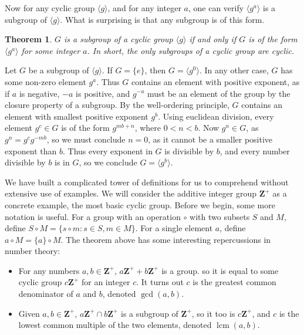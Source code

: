 \documentclass[12pt]{amsbook}
\makeatletter
\theoremstyle{plain}
\newtheorem{theorem}{Theorem}[chapter]
\theoremstyle{definition}
\renewenvironment{proof}[1][\proofname]{\par
  \pushQED{\qed}%
  \normalfont \topsep6\p@\@plus6\p@\relax
  \list{}{\leftmargin=0em
          \rightmargin=\leftmargin
          \settowidth{\itemindent}{\itshape#1}%
          \labelwidth=\itemindent}

  \item[\hskip\labelsep
        \itshape
    #1\@addpunct{.}]\ignorespaces
}{%
  \popQED\endlist\@endpefalse
}
\DeclareMathOperator{\lcm}{lcm}
\makeatother
\begin{document}
Now for any cyclic group $\langle g \rangle$, and for any integer $a$, one can verify $\langle g^a \rangle$ is a subgroup of $\langle g \rangle$. What is surprising is that any subgroup is of this form.

\begin{theorem}
    $G$ is a subgroup of a cyclic group $\langle g \rangle$ if and only if $G$ is of the form $\langle g^a \rangle$ for some integer $a$. In short, the only subgroups of a cyclic group are cyclic.
\end{theorem}
\begin{proof}
    Let $G$ be a subgroup of $\langle g \rangle$. If $G = \{ e \}$, then $G = \langle g^0 \rangle$. In any other case, $G$ has some non-zero element $g^a$. Thus $G$ contains an element with positive exponent, as if $a$ is negative, $-a$ is positive, and $g^{-a}$ must be an element of the group by the closure property of a subgroup. By the well-ordering principle, $G$ contains an element with smallest positive exponent $g^b$. Using euclidean division, every element $g^c \in G$ is of the form $g^{mb + n}$, where $0 < n < b$. Now $g^n \in G$, as $g^n = g^cg^{-mb}$, so we must conclude $n = 0$, as it cannot be a smaller positive exponent than $b$. Thus every exponent in $G$ is divisible by $b$, and every number divisible by $b$ is in $G$, so we conclude $G = \langle g^b \rangle$.
\end{proof}

We have built a complicated tower of definitions for us to comprehend without extensive use of examples. We will consider the additive integer group $\mathbf{Z}^+$ as a concrete example, the most basic cyclic group. Before we begin, some more notation is useful. For a group with an operation $\circ$ with two subsets $S$ and $M$, define $S \circ M = \{ s \circ m : s \in S, m \in M \}$. For a single element $a$, define $a \circ M = \{ a \} \circ M$. The theorem above has some interesting repercussions in number theory:
\begin{itemize}
    \item For any numbers $a, b \in \mathbf{Z}^+$, $a\mathbf{Z}^+ + b\mathbf{Z}^+$ is a group. so it is equal to some cyclic group $c\mathbf{Z}^+$ for an integer $c$. It turns out $c$ is the greatest common denominator  of $a$ and $b$, denoted $\gcd(a,b)$.
    \item Given $a,b \in \mathbf{Z}^+$, $a\mathbf{Z}^+ \cap b\mathbf{Z}^+$ is a subgroup of $\mathbf{Z}^+$, so it too is $c\mathbf{Z}^+$, and $c$ is the lowest common multiple  of the two elements, denoted $\lcm(a,b)$.
\end{itemize}
\end{document}
